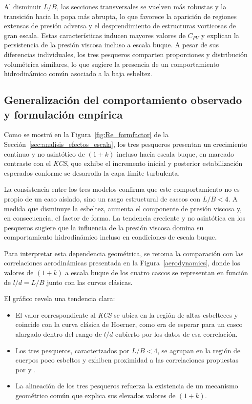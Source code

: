 Al disminuir $L/B$, las secciones transversales se vuelven más robustas y la transición hacia la popa más abrupta, lo que favorece la aparición de regiones extensas de presión adversa y el desprendimiento de estructuras vorticosas de gran escala. Estas características inducen mayores valores de $C_{PV}$ y explican la persistencia de la presión viscosa incluso a escala buque. A pesar de sus diferencias individuales, los tres pesqueros comparten proporciones y distribución volumétrica similares, lo que sugiere la presencia de un comportamiento hidrodinámico común asociado a la baja esbeltez.


\subsection{Generalización del comportamiento observado y formulación empírica}\label{sec:generalizacion_LB}

Como se mostró en la Figura~\ref{fig:Re_formfactor} de la 
Sección~\ref{sec:analisis_efectos_escala}, los tres pesqueros presentan 
un crecimiento continuo y no asintótico de $(1+k)$ incluso hacia escala 
buque, en marcado contraste con el \textit{KCS}, que exhibe el incremento inicial 
y posterior estabilización esperados conforme se desarrolla la capa límite 
turbulenta.

La consistencia entre los tres modelos confirma que este comportamiento no es propio de un caso aislado, sino un rasgo estructural de cascos con $L/B < 4$. A medida que disminuye la esbeltez, aumenta el componente de presión viscosa y, en consecuencia, el factor de forma. La tendencia creciente y no asintótica en los pesqueros sugiere que la influencia de la presión viscosa domina su comportamiento hidrodinámico incluso en condiciones de escala buque.

Para interpretar esta dependencia geométrica, se retoma la comparación con
las correlaciones aerodinámicas presentada en la
Figura~\ref{aerodynamics}, donde los valores de $(1+k)$ a escala buque de los
cuatro cascos se representan en función de $l/d = L/B$ junto con las curvas
clásicas.

El gráfico revela una tendencia clara:  
\begin{itemize}
    \item El valor correspondiente al \textit{KCS} se ubica en la región de altas esbelteces y coincide con la curva clásica de Hoerner, como era de esperar para un casco alargado dentro del rango de $l/d$ cubierto por los datos de esa correlación.
    \item Los tres pesqueros, caracterizados por $L/B < 4$, se agrupan en la región de cuerpos poco esbeltos y exhiben proximidad a las correlaciones propuestas por \cite{roskam1987airplane} y \cite{raymer2019aircraft}.
    \item La alineación de los tres pesqueros refuerza la existencia de un mecanismo geométrico común que explica sus elevados valores de $(1+k)$.
\end{itemize}


